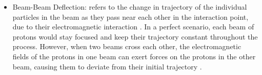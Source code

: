 \begin{itemize}

\item Beam-Beam Deflection: refers to the change in trajectory of the individual particles in the beam as they pass near each other in the interaction point, due to their electromagnetic interaction \cite{Herr:1982430}. In a perfect scenario, each beam of protons would stay focused and keep their trajectory constant throughout the process. However, when two beams cross each other, the electromagnetic fields of the protons in one beam can exert forces on the protons in the other beam, causing them to deviate from their initial trajectory \cite{babaev2023impact}.
  


\end{itemize}
